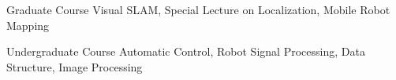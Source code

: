 

\begin{cvskills}

  \cvskill
    {Graduate Course} %
    {Visual SLAM, Special Lecture on Localization, Mobile Robot Mapping} %

  \cvskill
    {Undergraduate Course} %
    {Automatic Control, Robot Signal Processing, Data Structure, Image Processing} %

\end{cvskills}
